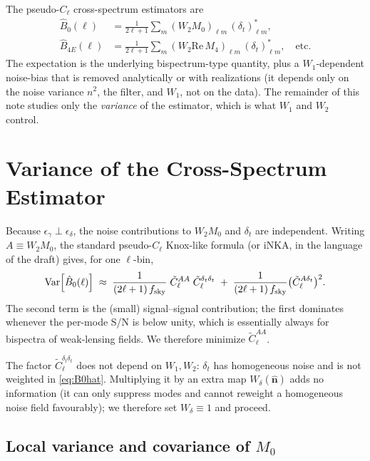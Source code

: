 \documentclass[11pt]{article}
\newcommand{\nv}{\hat{\boldsymbol{n}}}
\newcommand{\Var}{\mathrm{Var}}
\newcommand{\deltat}{\delta_t}
\newcommand{\Wone}{W_1}
\newcommand{\Wtwo}{W_2}
\begin{document}
The pseudo-$C_\ell$ cross-spectrum estimators are
\begin{align}
\hat B_0(\ell)
&=\frac{1}{2\ell+1}\sum_m (\Wtwo M_0)_{\ell m}\,(\deltat)^*_{\ell m},
\label{eq:B0hat}\\
\hat B_{4E}(\ell)
&=\frac{1}{2\ell+1}\sum_m (\Wtwo \mathrm{Re}\,M_4)_{\ell m}\,(\deltat)^*_{\ell m},
\quad\text{etc.}
\end{align}
The expectation is the underlying bispectrum-type quantity, plus a
$\Wone$-dependent noise-bias that is removed analytically or with
realizations (it depends only on the noise variance $n^2$, the filter, and $\Wone$,
not on the data). The remainder of this note studies only the \emph{variance}
of the estimator, which is what $\Wone$ and $\Wtwo$ control.

\section{Variance of the Cross-Spectrum Estimator}

Because $\epsilon_\gamma\perp\epsilon_\delta$, the noise contributions to
$\Wtwo M_0$ and $\deltat$ are independent. Writing $A\equiv \Wtwo M_0$, the
standard pseudo-$C_\ell$ Knox-like formula (or iNKA, in the language of the
draft) gives, for one $\ell$-bin,
\begin{equation}
\Var\!\left[\hat B_0(\ell)\right]\;\approx\;
\frac{1}{(2\ell+1)\,f_{\rm sky}}\;
\tilde C^{AA}_\ell\;\tilde C^{\deltat\deltat}_\ell
\;+\;\frac{1}{(2\ell+1)\,f_{\rm sky}}\bigl(\tilde C^{A\deltat}_\ell\bigr)^2.
\label{eq:knox}
\end{equation}
The second term is the (small) signal--signal contribution; the first
dominates whenever the per-mode S/N is below unity, which is essentially
always for bispectra of weak-lensing fields. We therefore minimize
$\tilde C^{AA}_\ell$.

The factor $\tilde C^{\deltat\deltat}_\ell$ does not depend on $\Wone,\Wtwo$:
$\deltat$ has homogeneous noise and is not weighted in
\cref{eq:B0hat}. Multiplying it by an extra map $W_\delta(\nv)$ adds no
information (it can only suppress modes and cannot reweight a homogeneous
noise field favourably); we therefore set $W_\delta\equiv 1$ and proceed.

\subsection{Local variance and covariance of $M_0$}\label{sec:M0var}
\end{document}
